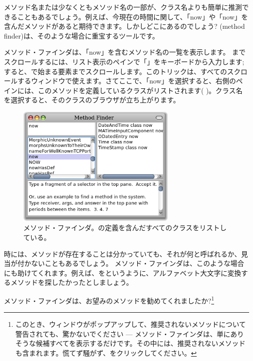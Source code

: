 \documentclass[a4paper,10pt,twoside]{book}
\begin{document}
メソッド名または少なくともメソッド名の一部が、クラス名よりも簡単に推測できることもあるでしょう。例えば、今現在の時間に関して、「now」や「now」を含んだメソッドがあると期待できます。しかしどこにあるのでしょう?
 (method finder)は、そのような場合に重宝するツールです。

メソッド・ファインダは、「now」を含むメソッド名の一覧を表示します。
までスクロールするには、リスト表示のペインで「」をキーボードから入力します; すると、で始まる要素までスクロールします。このトリックは、すべてのスクロールするウィンドウで使えます。さてここで、「now」を選択すると、右側のペインには、このメソッドを定義しているクラスがリストされます( )。クラス名を選択すると、そのクラスのブラウザが立ち上がります。

\begin{figure}[hbt]
\centerline {\includegraphics[width=0.7\textwidth]{methodFinder-now}}
\caption{メソッド・ファインダ。の定義を含んだすべてのクラスをリストしている。
}
\end{figure}

時には、メソッドが存在することは分かっていても、それが何と呼ばれるか、見当が付かないこともあるでしょう。
メソッド・ファインダは、このような場合にも助けてくれます。例えば、をというように、アルファベット大文字に変換するメソッドを探したかったとしましょう。

\noindent
メソッド・ファインダは、お望みのメソッドを勧めてくれましたか?\footnote{このとき、ウィンドウがポップアップして、推奨されないメソッドについて警告されても、驚かないでください --- メソッド・ファインダは、単にありそうな候補すべてを表示するだけです。その中には、推奨されないメソッドも含まれます。慌てず騒がず、をクリックしてください。}
\end{document}
